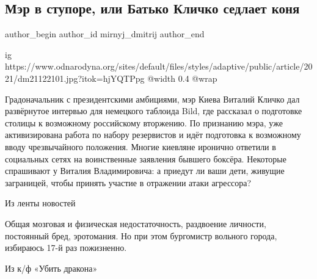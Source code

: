  
 
 
 
 
\subsection{Мэр в ступоре, или Батько Кличко седлает коня}
\label{sec:21_12_2021.stz.news.ru.odnarodyna.1.klichko_kiev}

\ifcmt
 author_begin
   author_id mirnyj_dmitrij
 author_end
\fi

\ifcmt
  ig https://www.odnarodyna.org/sites/default/files/styles/adaptive/public/article/2021/dm21122101.jpg?itok=hjYQTPpg
  @width 0.4
  @wrap 
\fi

Градоначальник с президентскими амбициями, мэр Киева Виталий Кличко дал
развёрнутое интервью для немецкого таблоида Bild, где рассказал о подготовке
столицы к возможному российскому вторжению. По признанию мэра, уже
активизирована работа по набору резервистов и идёт подготовка к возможному
вводу чрезвычайного положения. Многие киевляне иронично ответили в социальных
сетях на воинственные заявления бывшего боксёра. Некоторые спрашивают у Виталия
Владимировича: а приедут ли ваши дети, живущие заграницей, чтобы принять
участие в отражении атаки агрессора?

Из ленты новостей

Общая мозговая и физическая недостаточность, раздвоение личности, постоянный
бред, эротомания. Но при этом бургомистр вольного города, избираюсь 17-й раз
пожизненно.

Из к/ф «Убить дракона»

